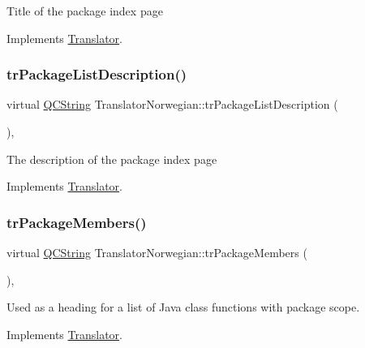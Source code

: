 Title of the package index page 

Implements \mbox{\hyperlink{class_translator}{Translator}}.

\mbox{\label{class_translator_norwegian_ae0077f95662dc4f9004d007905881e7a}} 
\subsubsection{\texorpdfstring{trPackageListDescription()}{trPackageListDescription()}}
{\footnotesize\ttfamily virtual \mbox{\hyperlink{class_q_c_string}{Q\+C\+String}} Translator\+Norwegian\+::tr\+Package\+List\+Description (\begin{DoxyParamCaption}{ }\end{DoxyParamCaption})\hspace{0.3cm}{\ttfamily [inline]}, {\ttfamily [virtual]}}

The description of the package index page 

Implements \mbox{\hyperlink{class_translator}{Translator}}.

\mbox{\label{class_translator_norwegian_a0fc9891ef8aa0ef67e33def1488b9b28}} 
\subsubsection{\texorpdfstring{trPackageMembers()}{trPackageMembers()}}
{\footnotesize\ttfamily virtual \mbox{\hyperlink{class_q_c_string}{Q\+C\+String}} Translator\+Norwegian\+::tr\+Package\+Members (\begin{DoxyParamCaption}{ }\end{DoxyParamCaption})\hspace{0.3cm}{\ttfamily [inline]}, {\ttfamily [virtual]}}

Used as a heading for a list of Java class functions with package scope. 

Implements \mbox{\hyperlink{class_translator}{Translator}}.

\mbox{\label{class_translator_norwegian_a274998ad1b62c49a131f7bd7a3d64e36}} 
